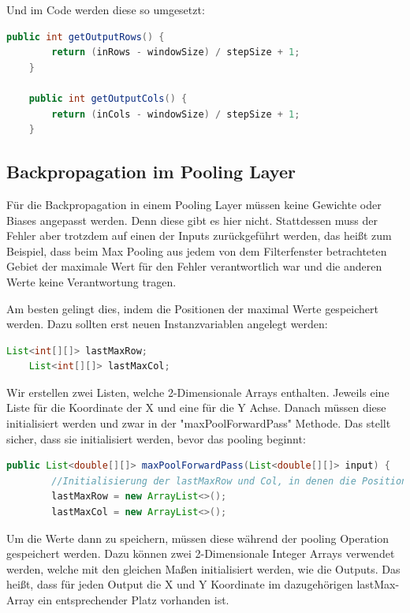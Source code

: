 \documentclass[12pt]{article}
\begin{document}
Und im Code werden diese so umgesetzt:

\begin{lstlisting}[language=Java]
    public int getOutputRows() {
        return (inRows - windowSize) / stepSize + 1;
    }

    public int getOutputCols() {
        return (inCols - windowSize) / stepSize + 1;
    }
\end{lstlisting}

\subsection{Backpropagation im Pooling Layer}
Für die Backpropagation in einem Pooling Layer müssen keine Gewichte oder Biases angepasst werden. Denn diese gibt es hier nicht. Stattdessen muss der Fehler aber trotzdem auf einen der Inputs zurückgeführt werden, das heißt zum Beispiel, dass beim Max Pooling aus jedem von dem Filterfenster betrachteten Gebiet der maximale Wert für den Fehler verantwortlich war und die anderen Werte keine Verantwortung tragen. 

Am besten gelingt dies, indem die Positionen der maximal Werte gespeichert werden.
Dazu sollten erst neuen Instanzvariablen angelegt werden:


\begin{lstlisting}[language=Java]
    List<int[][]> lastMaxRow;
    List<int[][]> lastMaxCol; 
\end{lstlisting}

Wir erstellen zwei Listen, welche 2-Dimensionale Arrays enthalten. Jeweils eine Liste für die Koordinate der X und eine für die Y Achse.
Danach müssen diese initialisiert werden und zwar in der "maxPoolForwardPass" Methode. Das stellt sicher, dass sie initialisiert werden, bevor das pooling beginnt:

\begin{lstlisting}[language=Java]
    public List<double[][]> maxPoolForwardPass(List<double[][]> input) {
        //Initialisierung der lastMaxRow und Col, in denen die Position der Maximalen Werte gespeichert werden
        lastMaxRow = new ArrayList<>();
        lastMaxCol = new ArrayList<>();
\end{lstlisting}

Um die Werte dann zu speichern, müssen diese während der pooling Operation gespeichert werden.
Dazu können zwei 2-Dimensionale Integer Arrays verwendet werden, welche mit den gleichen Maßen initialisiert werden, wie die Outputs. Das heißt, dass für jeden Output die X und Y Koordinate im dazugehörigen lastMax-Array ein entsprechender Platz vorhanden ist.
\end{document}
